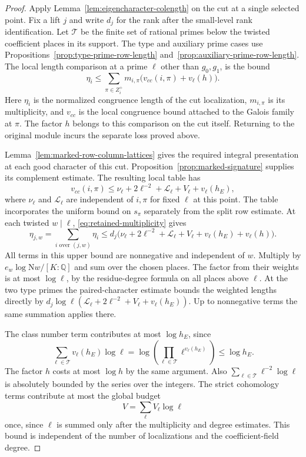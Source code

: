 \begin{proof}
Apply Lemma~\ref{lem:eigencharacter-colength} on the cut at
a single selected point. Fix a lift \(j\) and write \(d_j\) for the rank after
the small-level rank identification. Let \(\mathcal T\)
be the finite set of rational primes below the twisted
coefficient places in its support. The type and auxiliary prime cases use
Propositions~\ref{prop:type-prime-row-length}
and~\ref{prop:auxiliary-prime-row-length}. The local length
comparison at a prime \(\ell\) other than
\(g_0,g_1\), is the bound
\[
 \eta_i\le \sum_{\pi\in Z_i^+}
      m_{i,\pi}\bigl(v_{cc}(i,\pi)+v_\ell(h)\bigr).
\]
Here \(\eta_i\) is the normalized congruence length of the
cut localization, \(m_{i,\pi}\) is its multiplicity, and
\(v_{cc}\) is the local congruence bound attached to the
Galois family at \(\pi\). The factor \(h\) belongs to this
comparison on the cut itself. Returning to the original
module incurs the separate loss proved above.

Lemma~\ref{lem:marked-row-column-lattices} gives the required integral presentation at each good character of this cut. Proposition~\ref{prop:marked-signature} supplies its complement estimate. The resulting local table has
\[
 v_{cc}(i,\pi)\le
 \nu_\ell+2\ell^{-2}+\mathcal L_\ell+V_\ell+v_\ell(h_E),
\]
where \(\nu_\ell\) and \(\mathcal L_\ell\) are independent
of \(i,\pi\) for fixed \(\ell\) at this point. The table
incorporates the uniform bound on \(s_\pi\) separately
from the split row estimate. At each twisted \(w\mid\ell\), \eqref{eq:retained-multiplicity}
gives
\[
 \eta_{j,w}=\sum_{i\text{ over }(j,w)}\eta_i
 \le d_j\bigl(\nu_\ell+2\ell^{-2}+\mathcal L_\ell+V_\ell
                 +v_\ell(h_E)+v_\ell(h)\bigr).
\]
All terms in this upper bound are nonnegative and independent of
\(w\). Multiply by \(e_w\log\mathrm Nw/[K:\mathbb Q]\) and sum
over the chosen places. The factor from their weights is at most
\(\log\ell\), by the residue-degree formula on all places above
\(\ell\). At the two type primes the
paired-character estimate bounds the weighted lengths
directly by
\(d_j\log\ell(\mathcal L_\ell+2\ell^{-2}+V_\ell+v_\ell(h_E))\).
Up to nonnegative terms the same summation applies there.

The class number term contributes at most \(\log h_E\),
since
\[
 \sum_{\ell\in\mathcal T}v_\ell(h_E)\log\ell=\log\!\left(\prod_{\ell\in\mathcal T}\ell^{v_\ell(h_E)}\right)\le\log h_E.
\]
The factor \(h\) costs at most \(\log h\)
by the same argument. Also
\(\sum_{\ell\in\mathcal T}\ell^{-2}\log\ell\) is absolutely
bounded by the series over the integers. The strict
cohomology terms contribute at most the global budget
\[
 V=\sum_\ell V_\ell\log\ell
\]
once, since \(\ell\) is
summed only after the multiplicity and degree estimates.
This bound is independent of the number of localizations
and the coefficient-field degree.


\end{proof}
